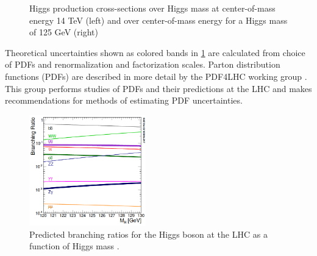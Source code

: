 \begin{figure}[H]
    \centering
    \qquad
    \caption{Higgs production cross-sections over Higgs mass at center-of-mass energy 14 TeV (left) and over center-of-mass energy for a Higgs mass of 125 GeV  (right)\cite{LHCCrossSectionWG}}%
    \label{fig:HiggsCrosssection}%
\end{figure}

Theoretical uncertainties shown as colored bands in \ref{fig:HiggsCrosssection} are calculated from choice of PDFs and renormalization and factorization scales. Parton distribution functions (PDFs) are described in more detail by the PDF4LHC working group \cite{PDF4LHC15}. This group performs studies of PDFs and their predictions at the LHC and makes recommendations for methods of estimating PDF uncertainties. 

\begin{figure}[H]
        \centering
    \includegraphics[width=0.45\textwidth] {Pictures/HiggsBranching.png}\hspace{1cm}
    \caption{Predicted branching ratios for the Higgs boson at the LHC as a function of Higgs mass \cite{LHCCrossSectionWG}.}
    \label{fig:HiggsBR}
\end{figure}

